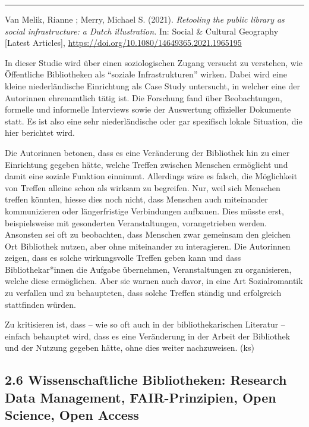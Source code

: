 \documentclass[a4paper,
fontsize=11pt,
oneside,
numbers=noperiodatend,
parskip=half-,
bibliography=totoc,
final
]{scrartcl}
\begin{document}
\begin{center}\rule{0.5\linewidth}{0.5pt}\end{center}

Van Melik, Rianne ; Merry, Michael S. (2021). \emph{Retooling the public
library as social infrastructure: a Dutch illustration.} In: Social \&
Cultural Geography {[}Latest Articles{]},
\url{https://doi.org/10.1080/14649365.2021.1965195}

In dieser Studie wird über einen soziologischen Zugang versucht zu
verstehen, wie Öffentliche Bibliotheken als \enquote{soziale
Infrastrukturen} wirken. Dabei wird eine kleine niederländische
Einrichtung als Case Study untersucht, in welcher eine der Autorinnen
ehrenamtlich tätig ist. Die Forschung fand über Beobachtungen, formelle
und informelle Interviews sowie der Auswertung offizieller Dokumente
statt. Es ist also eine sehr niederländische oder gar spezifisch lokale
Situation, die hier berichtet wird.

Die Autorinnen betonen, dass es eine Veränderung der Bibliothek hin zu
einer Einrichtung gegeben hätte, welche Treffen zwischen Menschen
ermöglicht und damit eine soziale Funktion einnimmt. Allerdings wäre es
falsch, die Möglichkeit von Treffen alleine schon als wirksam zu
begreifen. Nur, weil sich Menschen treffen könnten, hiesse dies noch
nicht, dass Menschen auch miteinander kommunizieren oder längerfristige
Verbindungen aufbauen. Dies müsste erst, beispielsweise mit gesonderten
Veranstaltungen, vorangetrieben werden. Ansonsten sei oft zu beobachten,
dass Menschen zwar gemeinsam den gleichen Ort Bibliothek nutzen, aber
ohne miteinander zu interagieren. Die Autorinnen zeigen, dass es solche
wirkungsvolle Treffen geben kann und dass Bibliothekar*innen die Aufgabe
übernehmen, Veranstaltungen zu organisieren, welche diese ermöglichen.
Aber sie warnen auch davor, in eine Art Sozialromantik zu verfallen und
zu behaupteten, dass solche Treffen ständig und erfolgreich stattfinden
würden.

Zu kritisieren ist, dass -- wie so oft auch in der bibliothekarischen
Literatur -- einfach behauptet wird, dass es eine Veränderung in der
Arbeit der Bibliothek und der Nutzung gegeben hätte, ohne dies weiter
nachzuweisen. (ks)

\hypertarget{wissenschaftliche-bibliotheken-research-data-management-fair-prinzipien-open-science-open-access}{%
\subsection{2.6 Wissenschaftliche Bibliotheken: Research Data Management,
FAIR-Prinzipien, Open Science, Open
Access}\label{wissenschaftliche-bibliotheken-research-data-management-fair-prinzipien-open-science-open-access}}
\end{document}
